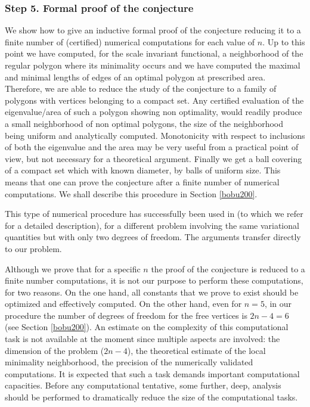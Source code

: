 \documentclass[11pt]{article}
\numberwithin{equation}{section}\newtheorem*{jepEnonce}{\jepEnonceTitle}\newenvironment{enonce*}[1]{\def\jepEnonceTitle{#1}\jepEnonce}{\endjepEnonce}\newtheorem*{conj*}{Conjecture}
\theoremstyle{plain}
\theoremstyle{definition}
\begin{document}
\subsubsection*{Step 5. Formal proof of the conjecture}
We show how to give an inductive formal proof of the conjecture reducing it to a finite number of (certified) numerical computations for each value of $n$. Up to this point we have computed, for the scale invariant functional, a neighborhood of the regular polygon where its minimality occurs and we have computed the maximal and minimal lengths of edges of an optimal polygon at prescribed area. Therefore, we are able to reduce the study of the conjecture to a family of polygons
with vertices belonging to a compact set. Any certified evaluation of the eigenvalue/area of such a polygon showing non optimality, would readily produce a small neighborhood of non optimal polygons, the size of the neighborhood being uniform and analytically computed. Monotonicity with respect to inclusions of both the eigenvalue and the area may be very useful from a practical point of view, but not necessary for a theoretical argument. Finally we get a ball covering of a compact set which with known diameter, by balls of uniform size. This means that one can prove the conjecture after a finite number of numerical computations. We shall describe this procedure in Section \ref{bobu200}.

This type of numerical procedure has successfully been used in \cite{BF16} (to which we refer for a detailed description), for a different problem involving the same variational quantities but with only two degrees of freedom. The arguments transfer directly to our problem.

Although we prove that for a specific $n$ the proof of the conjecture is reduced to a finite number computations, it is not our purpose to perform these computations, for two reasons. On the one hand, all constants that we prove to exist should be optimized and effectively computed. On the other hand, even for $n=5$, in our procedure the number of degrees of freedom for the free vertices is $2n-4=6$ (see Section \ref{bobu200}). An estimate on the complexity of this computational task is not available at the moment since multiple aspects are involved: the dimension of the problem ($2n-4$), the theoretical estimate of the local minimality neighborhood, the precision of the numerically validated computations. It is expected that such a task demands important computational capacities. Before any computational tentative, some further, deep, analysis should be performed to dramatically reduce the size of the computational tasks.
\end{document}
